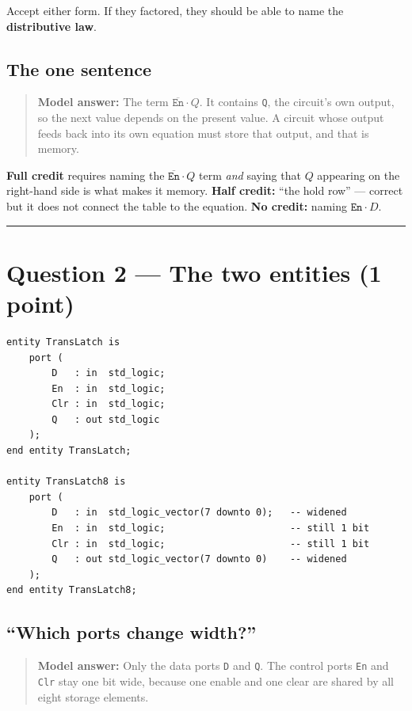 \documentclass[11pt]{article}
\newcommand{\code}[1]{\texttt{#1}}
\newcommand{\hr}{\vspace{2pt}\hrule\vspace{6pt}}
\begin{document}
Accept either form. If they factored, they should be able to name the
\textbf{distributive law}.

\subsection*{The one sentence}

\begin{quote}
\textbf{Model answer:} The term $\overline{\code{En}}\cdot Q$. It contains
\code{Q}, the circuit's own output, so the next value depends on the present
value. A circuit whose output feeds back into its own equation must store that
output, and that is memory.
\end{quote}

\textbf{Full credit} requires naming the $\overline{\code{En}}\cdot Q$ term
\emph{and} saying that $Q$ appearing on the right-hand side is what makes it
memory. \textbf{Half credit:} ``the hold row'' --- correct but it does not connect
the table to the equation. \textbf{No credit:} naming $\code{En}\cdot D$.

\vspace{4pt}\hr

\section*{Question 2 --- The two entities (1 point)}

\begin{lstlisting}
entity TransLatch is
    port (
        D   : in  std_logic;
        En  : in  std_logic;
        Clr : in  std_logic;
        Q   : out std_logic
    );
end entity TransLatch;

entity TransLatch8 is
    port (
        D   : in  std_logic_vector(7 downto 0);   -- widened
        En  : in  std_logic;                      -- still 1 bit
        Clr : in  std_logic;                      -- still 1 bit
        Q   : out std_logic_vector(7 downto 0)    -- widened
    );
end entity TransLatch8;
\end{lstlisting}

\subsection*{``Which ports change width?''}

\begin{quote}
\textbf{Model answer:} Only the data ports \code{D} and \code{Q}. The control
ports \code{En} and \code{Clr} stay one bit wide, because one enable and one clear
are shared by all eight storage elements.
\end{quote}
\end{document}
